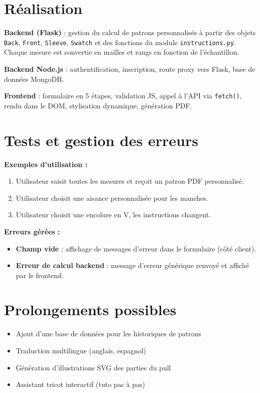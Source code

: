 \documentclass{article}
\begin{document}
\section{Réalisation}

\textbf{Backend (Flask)} : gestion du calcul de patrons personnalisés à partir des objets \texttt{Back}, \texttt{Front}, \texttt{Sleeve}, \texttt{Swatch} et des fonctions du module \texttt{instructions.py}. Chaque mesure est convertie en mailles et rangs en fonction de l'échantillon.

\textbf{Backend Node.js} : authentification, inscription, route proxy vers Flask, base de données MongoDB.

\textbf{Frontend} : formulaire en 5 étapes, validation JS, appel à l'API via \texttt{fetch()}, rendu dans le DOM, stylisation dynamique, génération PDF.

\section{Tests et gestion des erreurs}

\textbf{Exemples d'utilisation :}
\begin{enumerate}
    \item Utilisateur saisit toutes les mesures et reçoit un patron PDF personnalisé.
    \item Utilisateur choisit une aisance personnalisée pour les manches.
    \item Utilisateur choisit une encolure en V, les instructions changent.
\end{enumerate}

\textbf{Erreurs gérées :}
\begin{itemize}
    \item \textbf{Champ vide} : affichage de messages d'erreur dans le formulaire (côté client).
    \item \textbf{Erreur de calcul backend} : message d'erreur générique renvoyé et affiché par le frontend.
\end{itemize}

\section{Prolongements possibles}
\begin{itemize}
    \item Ajout d'une base de données pour les historiques de patrons
    \item Traduction multilingue (anglais, espagnol)
    \item Génération d'illustrations SVG des parties du pull
    \item Assistant tricot interactif (tuto pas à pas)
\end{itemize}
\end{document}
